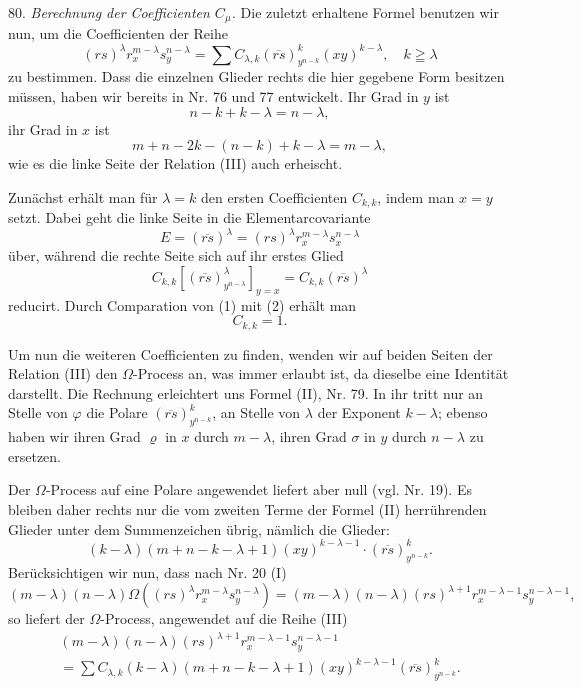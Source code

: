\documentclass[11pt]{article}
\providecommand{\weberpage}[1]{}
\providecommand{\weq}[2]{\begin{equation}\tag{#1}#2\end{equation}}
\let\Omega\varOmega
\begin{document}
\weberpage{84}

80. \textit{Berechnung der Coefficienten $C_\mu$.} Die zuletzt erhaltene Formel benutzen wir nun, um die Coefficienten der Reihe
\weq{III}{(rs)^\lambda r_x^{m-\lambda} s_y^{n-\lambda} = \sum C_{\lambda,k} (\overline{rs})_{y^{n-k}}^k (xy)^{k-\lambda}, \quad k \geqq \lambda}
zu bestimmen. Dass die einzelnen Glieder rechts die hier gegebene Form besitzen müssen, haben wir bereits in Nr. 76 und 77 entwickelt. Ihr Grad in $y$ ist
\[ n-k+k-\lambda = n-\lambda, \]
ihr Grad in $x$ ist
\[ m+n-2k-(n-k)+k-\lambda = m-\lambda, \]
wie es die linke Seite der Relation (III) auch erheischt.

Zunächst erhält man für $\lambda=k$ den ersten Coefficienten $C_{k,k}$, indem man $x=y$ setzt. Dabei geht die linke Seite in die Elementarcovariante
\weq{1}{E = (\overline{rs})^\lambda = (rs)^\lambda r_x^{m-\lambda} s_x^{n-\lambda}}
über, während die rechte Seite sich auf ihr erstes Glied
\weq{2}{C_{k,k}\left[(\overline{rs})_{y^{n-\lambda}}^\lambda\right]_{y=x} = C_{k,k}(\overline{rs})^\lambda}
reducirt. Durch Comparation von (1) mit (2) erhält man
\[ C_{k,k} = 1. \]

Um nun die weiteren Coefficienten zu finden, wenden wir auf beiden Seiten der Relation (III) den $\Omega$-Process an, was immer erlaubt ist, da dieselbe eine Identität darstellt. Die Rechnung erleichtert uns Formel (II), Nr. 79. In ihr tritt nur an Stelle von $\varphi$ die Polare $(\overline{rs})_{y^{n-k}}^k$, an Stelle von $\lambda$ der Exponent $k-\lambda$; ebenso haben wir ihren Grad $\varrho$ in $x$ durch $m-\lambda$, ihren Grad $\sigma$ in $y$ durch $n-\lambda$ zu ersetzen.

Der $\Omega$-Process auf eine Polare angewendet liefert aber null (vgl. Nr. 19). Es bleiben daher rechts nur die vom zweiten Terme der Formel (II) herrührenden Glieder unter dem Summenzeichen übrig, nämlich die Glieder:
\[ (k-\lambda)(m+n-k-\lambda+1)(xy)^{k-\lambda-1}\cdot(\overline{rs})_{y^{n-k}}^k. \]
Berücksichtigen wir nun, dass nach Nr. 20 (I)
\[ (m-\lambda)(n-\lambda)\Omega\!\left((rs)^\lambda r_x^{m-\lambda} s_y^{n-\lambda}\right) = (m-\lambda)(n-\lambda)(rs)^{\lambda+1} r_x^{m-\lambda-1} s_y^{n-\lambda-1}, \]
so liefert der $\Omega$-Process, angewendet auf die Reihe (III)
\weq{IV}{\begin{aligned}(m-\lambda)(n-\lambda)(rs)^{\lambda+1} r_x^{m-\lambda-1} s_y^{n-\lambda-1} \\ = \sum C_{\lambda,k}(k-\lambda)(m+n-k-\lambda+1)(xy)^{k-\lambda-1}(\overline{rs})_{y^{n-k}}^k.\end{aligned}}
\end{document}
